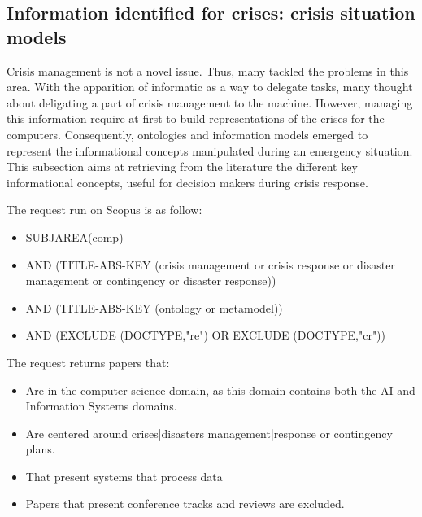 \subsection{Information identified for crises: crisis situation models}
Crisis management is not a novel issue.
Thus, many tackled the problems in this area.
With the apparition of informatic as a way to delegate tasks, many thought about deligating a part of crisis management to the machine.
However, managing this information require at first to build representations of the crises for the computers.
Consequently, ontologies and information models emerged to represent the informational concepts manipulated during an emergency situation.
This subsection aims at retrieving from the literature the different key informational concepts, useful for decision makers during crisis response.

The request run on Scopus is as follow:
\begin{itemize}
    \item SUBJAREA(comp)
    \item AND (TITLE-ABS-KEY ({crisis management} or {crisis response} or {disaster management} or contingency or {disaster response}))
    \item AND (TITLE-ABS-KEY (ontology or metamodel))
    \item AND (EXCLUDE (DOCTYPE,"re") OR EXCLUDE (DOCTYPE,"cr"))
\end{itemize}

The request returns papers that:
\begin{itemize}
    \item Are in the computer science domain, as this domain contains both the AI and Information Systems domains.
    \item Are centered around crises|disasters management|response or contingency plans.
    \item That present systems that process data
    \item Papers that present conference tracks and reviews are excluded.
\end{itemize}

